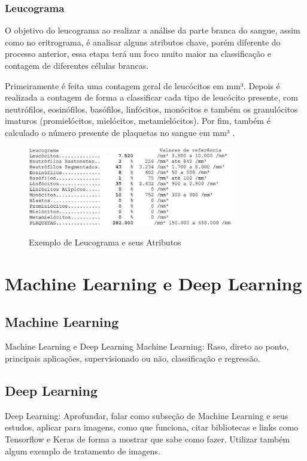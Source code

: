 \subsubsection{Leucograma}
O objetivo do leucograma ao realizar a análise da parte branca do sangue, assim como no eritrograma, é analisar alguns atributos chave, porém diferente do processo anterior, essa etapa terá um foco muito maior na classificação e contagem de diferentes células brancas.

Primeiramente é feita uma contagem geral de leucócitos em mm³. Depois é realizada a contagem de forma a classificar cada tipo de leucócito presente, com neutrófilos, eosinófilos, basófilos, linfócitos, monócitos e também os granulócitos imaturos (promielócitos, mielócitos, metamielócitos). Por fim, também é calculado o número presente de plaquetas no sangue em mm³ \cite{interpretacaoHemograma, manualHematologia}.

\begin{figure}[!htb]
    \centering
    \caption{Exemplo de Leucograma e seus Atributos}
    \includegraphics[width=0.80\textwidth]{img/leucograma.jpg}
    \label{fig:hemograma}
 \end{figure}

\section{Machine Learning e Deep Learning}
\label{sec:conceito2}

\subsection{Machine Learning}
Machine Learning e Deep Learning
Machine Learning: Raso, direto ao ponto, principais aplicações, supervisionado ou não, classificação e regressão.

\subsection{Deep Learning}
Deep Learning: Aprofundar, falar como subseção de Machine Learning e seus estudos, aplicar para imagens, como que funciona, citar bibliotecas e links como Tensorflow e Keras de forma a mostrar que sabe como fazer. Utilizar também algum exemplo de tratamento de imagens. 

